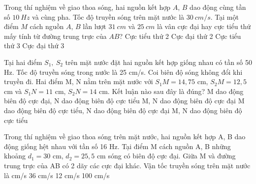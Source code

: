 \begin{ex}
Trong thí nghiệm về giao thoa sóng, hai nguồn kết hợp $A$, $B$ dao động cùng tần số $10\ Hz$ và cùng pha. Tốc độ truyền sóng trên mặt nước là $30\ cm/s$. Tại một điểm $M$ cách nguồn $A$, $B$ lần lượt $31\ cm$ và $25\ cm$ là vân cực đại hay cực tiểu thứ mấy tính từ đường trung trực của $AB$?
\choice
{Cực tiểu thứ 2}
{\True Cực đại thứ 2}
{Cực tiểu thứ 3}
{Cực đại thứ 3}
\loigiai{ }
\end{ex}
\begin{ex}%
Tại hai điểm $S_1,\ S_2$ trên mặt nước đặt hai nguồn kết hợp giống nhau có tần số 50 Hz. Tốc độ truyền sóng trong nước là 25 cm/s. Coi biên độ sóng không đổi khi truyền đi. Hai điểm M, N nằm trên mặt nước với $S_1M = 14,75$ cm, $S_2M = 12,5$ cm và $S_1N = 11$ cm, $S_2N = 14$ cm. Kết luận nào sau đây là đúng?
\choice
{M dao động biên độ cực đại, N dao động biên độ cực tiểu}
{M, N dao động biên độ cực đại}
{\True M dao động biên độ cực tiểu, N dao động biên độ cực đại}
{M, N dao động biên độ cực tiểu}
\end{ex} 
\begin{ex}%
Trong thí nghiệm về giao thoa sóng trên mặt nước, hai nguồn kết hợp A, B dao động giống hệt nhau với tần số 16 Hz. Tại điểm M cách nguồn A, B những khoảng $d_1=30$ cm, $d_2=25,5$ cm sóng có biên độ cực đại. Giữa M và đường trung trực của AB có 2 dãy các cực đại khác. Vận tốc truyền sóng trên mặt nước là
\choice
{ cm/s}
{36 cm/s}
{12 cm/s}
{100 cm/s}
\end{ex} 
